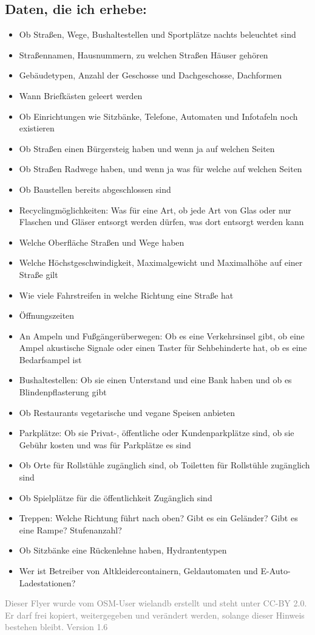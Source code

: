 \documentclass[10pt,foldmark,notumble]{leaflet}
\begin{document}
    \subsection{Daten, die ich erhebe:}
    \begin{itemize}[noitemsep,topsep=0pt]
        \item Ob Straßen, Wege, Bushaltestellen und Sportplätze nachts beleuchtet sind
        \item Straßennamen, Hausnummern, zu welchen Straßen Häuser gehören
        \item Gebäudetypen, Anzahl der Geschosse und Dachgeschosse, Dachformen
        \item Wann Briefkästen geleert werden
        \item Ob Einrichtungen wie Sitzbänke, Telefone, Automaten und Infotafeln noch existieren
        \item Ob Straßen einen Bürgersteig haben und wenn ja auf welchen Seiten
        \item Ob Straßen Radwege haben, und wenn ja was für welche auf welchen Seiten
        \item Ob Baustellen bereits abgeschlossen sind
        \item Recyclingmöglichkeiten: Was für eine Art, ob jede Art von Glas oder nur Flaschen und Gläser entsorgt werden dürfen, was dort entsorgt werden kann
        \item Welche Oberfläche Straßen und Wege haben
        \item Welche Höchstgeschwindigkeit, Maximalgewicht und Maximalhöhe auf einer Straße gilt
        \item Wie viele Fahrstreifen in welche Richtung eine Straße hat
        \item Öffnungszeiten
        \item An Ampeln und Fußgängerüberwegen: Ob es eine Verkehrsinsel gibt, ob eine Ampel akustische Signale oder einen Taster für Sehbehinderte hat, ob es eine Bedarfsampel ist
        \item Bushaltestellen: Ob sie einen Unterstand und eine Bank haben und ob es Blindenpflasterung gibt
        \item Ob Restaurants vegetarische und vegane Speisen anbieten
        \item Parkplätze: Ob sie Privat-, öffentliche oder Kundenparkplätze sind, ob sie Gebühr kosten und was für Parkplätze es sind
        \item Ob Orte für Rollstühle zugänglich sind, ob Toiletten für Rollstühle zugänglich sind
        \item Ob Spielplätze für die öffentlichkeit Zugänglich sind
        \item Treppen: Welche Richtung führt nach oben? Gibt es ein Geländer? Gibt es eine Rampe? Stufenanzahl?
        \item Ob Sitzbänke eine Rückenlehne haben, Hydrantentypen
        \item Wer ist Betreiber von Altkleidercontainern, Geldautomaten und E-Auto-Ladestationen?
    \end{itemize}


    \vfill
    \textcolor{gray}{\small Dieser Flyer wurde vom OSM-User wielandb erstellt und steht unter CC-BY 2.0.
    Er darf frei kopiert, weitergegeben und verändert werden, solange dieser Hinweis bestehen bleibt.
    Version 1.6}
\end{document}
